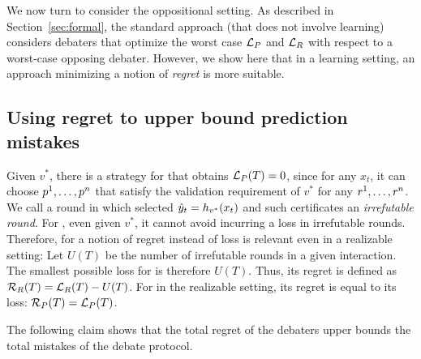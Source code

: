 \documentclass[11pt,letterpaper]{article}
\theoremstyle{definition}
\theoremstyle{plain}
\begin{document}
We now turn to consider the oppositional setting. As described in Section~\ref{sec:formal}, the standard approach (that does not involve learning) considers debaters that optimize the worst case ${{\mathcal L}_P}$ and ${{\mathcal L}_R}$ with respect to a worst-case opposing debater. However, we show here that in a learning setting, an approach minimizing a notion of \emph{regret} is more suitable. 

\subsection{Using regret to upper bound prediction mistakes}

Given $v^*$, there is a strategy for \dt that obtains ${{\mathcal L}_P}(T) = 0$, since for any $x_t$, it can choose ${p}^1,\ldots,{p}^n$ that satisfy the validation requirement of $v^*$ for any ${r}^1,\ldots,{r}^n$. We call a round in which \dt selected ${\hat{y}}_t  = h_{v^*}(x_t)$ and such certificates an \emph{irrefutable round}. For \df, even given $v^*$, it cannot avoid incurring a loss in irrefutable rounds. Therefore, for \df a notion of regret instead of loss is relevant even in a realizable setting: Let $U(T)$ be the number of irrefutable rounds in a given interaction. The smallest possible loss for \df is therefore $U(T)$. Thus, its regret is defined as ${{\mathcal R}_R}(T) = {{\mathcal L}_R}(T) - U(T)$. For \dt in the realizable setting, its regret is equal to its loss: 
${{\mathcal R}_P}(T) = {{\mathcal L}_P}(T)$. 


The following claim shows that the total regret of the debaters upper bounds the total mistakes of the debate protocol. 









\end{document}
